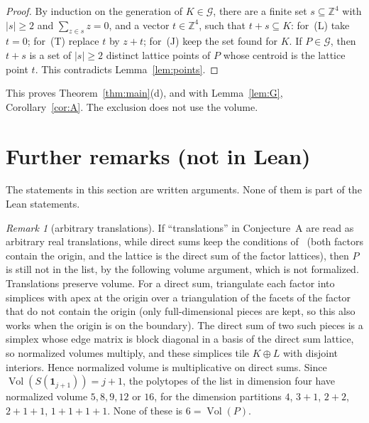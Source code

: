\documentclass[11pt]{article}
\theoremstyle{definition}
\theoremstyle{remark}
\newtheorem{remark}{Remark}
\newcommand{\Z}{\mathbb Z}
\newcommand{\one}{\mathbf 1}
\newcommand{\Vol}{\operatorname{Vol}}
\newcommand{\G}{\mathcal G}
\begin{document}
\begin{proof}
By induction on the generation of $K\in\G$, there are a finite set
$s\subseteq\Z^4$ with $|s|\ge2$ and $\sum_{z\in s}z=0$, and a vector
$t\in\Z^4$, such that $t+s\subseteq K$: for~(L) take $t=0$; for~(T) replace
$t$ by $z+t$; for~(J) keep the set found for $K$. If $P\in\G$, then $t+s$ is a
set of $|s|\ge2$ distinct lattice points of $P$ whose centroid is the lattice
point $t$. This contradicts Lemma~\ref{lem:points}.
\end{proof}

\noindent This proves Theorem~\ref{thm:main}(d), and with
Lemma~\ref{lem:G}, Corollary~\ref{cor:A}. The exclusion does not use the
volume.

\section{Further remarks (not in Lean)}\label{sec:remarks}

The statements in this section are written arguments. None of them is part
of the Lean statements.

\begin{remark}[arbitrary translations]\label{rem:real}
If ``translations'' in Conjecture~A are read as arbitrary real translations,
while direct sums keep the conditions of~\cite[Section~2.1]{css} (both factors
contain the origin, and the lattice is the direct sum of the factor lattices),
then $P$ is still not in the list, by the following volume argument, which is
not formalized. Translations preserve volume. For a direct sum, triangulate
each factor into simplices with apex at the origin over a triangulation of
the facets of the factor that do not contain the origin (only full-dimensional pieces are kept, so this also
works when the origin is on the boundary). The direct sum of two such pieces
is a simplex whose edge matrix is block diagonal in a basis of the direct sum
lattice, so normalized volumes multiply, and these simplices tile $K\oplus L$
with disjoint interiors. Hence normalized volume is multiplicative on direct
sums. Since $\Vol(S(\one_{j+1}))=j+1$, the polytopes of the list in dimension
four have normalized volume $5,8,9,12$ or $16$, for the dimension partitions
$4$, $3+1$, $2+2$, $2+1+1$, $1+1+1+1$. None of these is $6=\Vol(P)$.
\end{remark}
\end{document}
